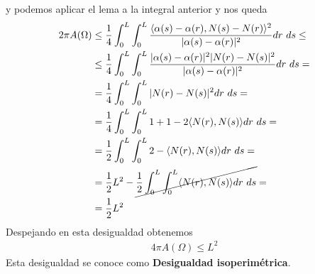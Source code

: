 \begin{observacion}
\begin{enumerate}[start=4]
        y podemos aplicar el lema a la integral anterior y nos queda
        \begin{align*}
            2\pi A(\Omega) &\leq
            \frac{1}{4} \int_0^L \int_0^L \frac{\langle \alpha(s) -\alpha(r), N(s) - N(r) \rangle^2}{|\alpha(s)-\alpha(r)|^2} dr\ ds \leq\\
            &\leq
            \frac{1}{4} \int_0^L \int_0^L \frac{|\alpha(s) - \alpha(r)|^2|N(r)-N(s)|^2}{|\alpha(s)-\alpha(r)|^2} dr\ ds = \\
            &= 
            \frac{1}{4} \int_0^L \int_0^L |N(r)-N(s)|^2 dr\ ds =\\
            &= 
            \frac{1}{4} \int_0^L \int_0^L 1 + 1 -2\langle N(r),N(s) \rangle dr\ ds =\\
            &= 
            \frac{1}{2} \int_0^L \int_0^L 2 -\langle N(r),N(s) \rangle dr\ ds =\\
            &= \frac{1}{2} L^2 - \cancel{\frac{1}{2} \int_0^L \int_0^L \langle N(r), N(s) \rangle dr\ ds} =\\
            &=
            \frac{1}{2} L^2
        \end{align*}
        Despejando en esta desigualdad obtenemos
        \begin{gather*}
            \boxed{4\pi A(\Omega) \leq L^2}
        \end{gather*}
        Esta desigualdad se conoce como \textbf{Desigualdad isoperimétrica}.\\


\end{enumerate}
\end{observacion}

